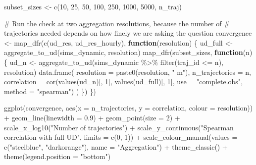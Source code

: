 \documentclass[
  letterpaper,
  DIV=11,
  numbers=noendperiod]{scrartcl}
\newenvironment{Shaded}{\begin{snugshade}}{\end{snugshade}}
\newcommand{\AttributeTok}[1]{\textcolor[rgb]{0.40,0.45,0.13}{#1}}
\newcommand{\CommentTok}[1]{\textcolor[rgb]{0.37,0.37,0.37}{#1}}
\newcommand{\ControlFlowTok}[1]{\textcolor[rgb]{0.00,0.23,0.31}{\textbf{#1}}}
\newcommand{\DecValTok}[1]{\textcolor[rgb]{0.68,0.00,0.00}{#1}}
\newcommand{\FloatTok}[1]{\textcolor[rgb]{0.68,0.00,0.00}{#1}}
\newcommand{\FunctionTok}[1]{\textcolor[rgb]{0.28,0.35,0.67}{#1}}
\newcommand{\NormalTok}[1]{\textcolor[rgb]{0.00,0.23,0.31}{#1}}
\newcommand{\OtherTok}[1]{\textcolor[rgb]{0.00,0.23,0.31}{#1}}
\newcommand{\SpecialCharTok}[1]{\textcolor[rgb]{0.37,0.37,0.37}{#1}}
\newcommand{\StringTok}[1]{\textcolor[rgb]{0.13,0.47,0.30}{#1}}
\begin{document}
\begin{Shaded}
\begin{Highlighting}[]
\NormalTok{subset\_sizes }\OtherTok{\textless{}{-}} \FunctionTok{c}\NormalTok{(}\DecValTok{10}\NormalTok{, }\DecValTok{25}\NormalTok{, }\DecValTok{50}\NormalTok{, }\DecValTok{100}\NormalTok{, }\DecValTok{250}\NormalTok{, }\DecValTok{1000}\NormalTok{, }\DecValTok{5000}\NormalTok{, n\_traj)}

\CommentTok{\# Run the check at two aggregation resolutions, because the number of}
\CommentTok{\# trajectories needed depends on how finely we are asking the question}
\NormalTok{convergence }\OtherTok{\textless{}{-}} \FunctionTok{map\_dfr}\NormalTok{(}\FunctionTok{c}\NormalTok{(ud\_res, ud\_res\_hourly), }\ControlFlowTok{function}\NormalTok{(resolution) \{}
\NormalTok{  ud\_full }\OtherTok{\textless{}{-}} \FunctionTok{aggregate\_to\_ud}\NormalTok{(sims\_dynamic, resolution)}
  \FunctionTok{map\_dfr}\NormalTok{(subset\_sizes, }\ControlFlowTok{function}\NormalTok{(n) \{}
\NormalTok{    ud\_n }\OtherTok{\textless{}{-}} \FunctionTok{aggregate\_to\_ud}\NormalTok{(sims\_dynamic }\SpecialCharTok{\%\textgreater{}\%} \FunctionTok{filter}\NormalTok{(traj\_id }\SpecialCharTok{\textless{}=}\NormalTok{ n), resolution)}
    \FunctionTok{data.frame}\NormalTok{(}
      \AttributeTok{resolution =} \FunctionTok{paste0}\NormalTok{(resolution, }\StringTok{" m"}\NormalTok{),}
      \AttributeTok{n\_trajectories =}\NormalTok{ n,}
      \AttributeTok{correlation =} \FunctionTok{cor}\NormalTok{(}\FunctionTok{values}\NormalTok{(ud\_n)[, }\DecValTok{1}\NormalTok{], }\FunctionTok{values}\NormalTok{(ud\_full)[, }\DecValTok{1}\NormalTok{],}
                        \AttributeTok{use =} \StringTok{"complete.obs"}\NormalTok{, }\AttributeTok{method =} \StringTok{"spearman"}\NormalTok{)}
\NormalTok{    )}
\NormalTok{  \})}
\NormalTok{\})}

\FunctionTok{ggplot}\NormalTok{(convergence, }\FunctionTok{aes}\NormalTok{(}\AttributeTok{x =}\NormalTok{ n\_trajectories, }\AttributeTok{y =}\NormalTok{ correlation, }\AttributeTok{colour =}\NormalTok{ resolution)) }\SpecialCharTok{+}
  \FunctionTok{geom\_line}\NormalTok{(}\AttributeTok{linewidth =} \FloatTok{0.9}\NormalTok{) }\SpecialCharTok{+}
  \FunctionTok{geom\_point}\NormalTok{(}\AttributeTok{size =} \DecValTok{2}\NormalTok{) }\SpecialCharTok{+}
  \FunctionTok{scale\_x\_log10}\NormalTok{(}\StringTok{"Number of trajectories"}\NormalTok{) }\SpecialCharTok{+}
  \FunctionTok{scale\_y\_continuous}\NormalTok{(}\StringTok{"Spearman correlation with full UD"}\NormalTok{, }\AttributeTok{limits =} \FunctionTok{c}\NormalTok{(}\DecValTok{0}\NormalTok{, }\DecValTok{1}\NormalTok{)) }\SpecialCharTok{+}
  \FunctionTok{scale\_colour\_manual}\NormalTok{(}\AttributeTok{values =} \FunctionTok{c}\NormalTok{(}\StringTok{"steelblue"}\NormalTok{, }\StringTok{"darkorange"}\NormalTok{), }\AttributeTok{name =} \StringTok{"Aggregation"}\NormalTok{) }\SpecialCharTok{+}
  \FunctionTok{theme\_classic}\NormalTok{() }\SpecialCharTok{+}
  \FunctionTok{theme}\NormalTok{(}\AttributeTok{legend.position =} \StringTok{"bottom"}\NormalTok{)}
\end{Highlighting}
\end{Shaded}
\end{document}
